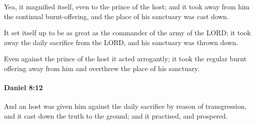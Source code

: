 			\begin{versebox}
					\item[BHS] 
					\item[LXX] 
					\item[ASV] Yea, it magnified itself, even to the prince of the host; and it took away from him the continual burnt-offering, and the place of his sanctuary was cast down.
					\item[NIV] It set itself up to be as great as the commander of the army of the LORD; it took away the daily sacrifice from the LORD, and his sanctuary was thrown down.
					\item[NRSV] Even against the prince of the host it acted arrogantly; it took the regular burnt offering away from him and overthrew the place of his sanctuary.
			\end{versebox}

		\paragraph{Daniel 8:12} %
			\label{DANIEL-8-12}

			And an host was given him against the daily sacrifice by reason of transgression, and it cast down the truth to the ground; and it practised, and prospered.

